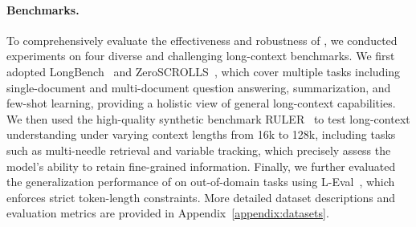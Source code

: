 \documentclass[11pt]{article}
\newcommand{\ours}{\text{BEAVER}\xspace}
\begin{document}
\paragraph{Benchmarks.} To comprehensively evaluate the effectiveness and robustness of \ours, we conducted experiments on four diverse and challenging long-context benchmarks. We first adopted LongBench~\cite{bai2024longbench} and ZeroSCROLLS~\cite{shaham2023zeroscrolls}, which cover multiple tasks including single-document and multi-document question answering, summarization, and few-shot learning, providing a holistic view of general long-context capabilities. We then used the high-quality synthetic benchmark RULER~\cite{hsieh2024ruler} to test long-context understanding under varying context lengths from 16k to 128k, including tasks such as multi-needle retrieval and variable tracking, which precisely assess the model’s ability to retain fine-grained information. Finally, we further evaluated the generalization performance of \ours on out-of-domain tasks using L-Eval~\cite{an2024eval}, which enforces strict token-length constraints. More detailed dataset descriptions and evaluation metrics are provided in Appendix~\ref{appendix:datasets}.  

\end{document}
